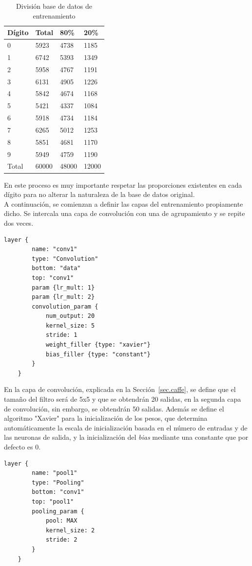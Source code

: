 	\begin{table}[htb]
		\centering
		\begin{tabular}{|l|l|l|l|}
			\hline
			Dígito & Total & 80\% & 20\% \\
			\hline \hline
			0 & 5923 & 4738 & 1185\\ \hline
			1 & 6742 & 5393 & 1349\\ \hline
			2 & 5958 & 4767 & 1191\\ \hline
			3 & 6131 & 4905 & 1226\\ \hline
			4 & 5842 & 4674 & 1168\\ \hline
			5 & 5421 & 4337 & 1084\\ \hline
			6 & 5918 & 4734 & 1184\\ \hline
			7 & 6265 & 5012 & 1253\\ \hline
			8 & 5851 & 4681 & 1170\\ \hline
			9 & 5949 & 4759 & 1190\\ \hline
			Total & 60000 & 48000 & 12000\\ \hline
		\end{tabular}
		\caption{División base de datos de entrenamiento}
		\label{tabla:sencilla2}
	\end{table}
	\vspace{20pt}
	En este proceso es muy importante respetar las proporciones existentes en cada dígito para no alterar la naturaleza de la base de datos original.\\
	
	A continuación, se comienzan a definir las capas del entrenamiento propiamente dicho. Se intercala una capa de convolución con una de agrupamiento y se repite dos veces.
	\vspace{10pt}
	\begin{lstlisting}[frame=single]
	layer {
		name: "conv1"
		type: "Convolution"
		bottom: "data"
		top: "conv1"
		param {lr_mult: 1}
		param {lr_mult: 2}
		convolution_param {
			num_output: 20
			kernel_size: 5
			stride: 1
			weight_filler {type: "xavier"}
			bias_filler {type: "constant"}
		}
	}	
	\end{lstlisting}

	En la capa de convolución, explicada en la Sección~\ref{sec.caffe}, se define que el tamaño del filtro será de 5x5 y que se obtendrán 20 salidas, en la segunda capa de convolución, sin embargo, se obtendrán 50 salidas. Además se define el algoritmo "Xavier" para la inicialización de los pesos, que determina automáticamente la escala de inicialización basada en el número de entradas y de las neuronas de salida, y la inicialización del \textit{bias} mediante una constante que por defecto es 0.
	\vspace{10pt}
	\begin{lstlisting}[frame=single]
	layer {
		name: "pool1"
		type: "Pooling"
		bottom: "conv1"
		top: "pool1"
		pooling_param {
			pool: MAX
			kernel_size: 2
			stride: 2
		}
	}	
	\end{lstlisting}
	
